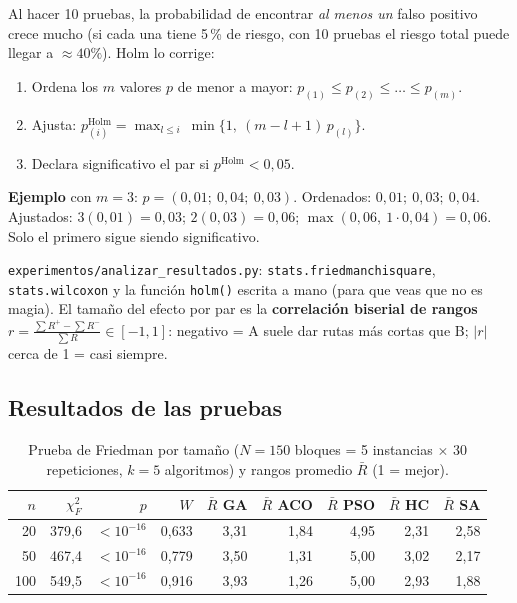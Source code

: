 \documentclass[11pt,a4paper]{article}
\newcommand{\archivo}[1]{\texttt{#1}}
\begin{document}
\begin{mate}
Al hacer 10 pruebas, la probabilidad de encontrar \emph{al menos un} falso positivo crece mucho (si cada una tiene 5\,\% de riesgo, con 10 pruebas
el riesgo total puede llegar a $\approx40\text{\%}$). Holm lo corrige:
\begin{enumerate}
\item Ordena los $m$ valores $p$ de menor a mayor: $p_{(1)}\le p_{(2)}\le\dots\le p_{(m)}$.
\item Ajusta: $p^{\text{Holm}}_{(i)}=\max_{l\le i}\ \min\{1,\ (m-l+1)\,p_{(l)}\}$.
\item Declara significativo el par si $p^{\text{Holm}}<0{,}05$.
\end{enumerate}
\textbf{Ejemplo} con $m=3$: $p=(0{,}01;\ 0{,}04;\ 0{,}03)$. Ordenados: $0{,}01;\ 0{,}03;\ 0{,}04$. Ajustados: $3(0{,}01)=0{,}03$;\; $2(0{,}03)=0{,}06$;\;
$\max(0{,}06,\ 1\cdot0{,}04)=0{,}06$. Solo el primero sigue siendo significativo.
\end{mate}
\begin{codigo}
\archivo{experimentos/analizar\_resultados.py}: \texttt{stats.friedmanchisquare}, \texttt{stats.wilcoxon} y la función \texttt{holm()}
escrita a mano (para que veas que no es magia). El tamaño del efecto por par es la \textbf{correlación biserial de rangos}
$r=\frac{\sum R^+-\sum R^-}{\sum R}\in[-1,1]$: negativo = A suele dar rutas más cortas que B; $|r|$ cerca de 1 = casi siempre.
\end{codigo}

\subsection{Resultados de las pruebas}
\begin{table}[H]\centering\small
\begin{tabular}{rrrrrrrrr}
\toprule
$n$ & $\chi^2_F$ & $p$ & $W$ & $\bar R$ GA & $\bar R$ ACO & $\bar R$ PSO & $\bar R$ HC & $\bar R$ SA \\
\midrule
20 & 379{,}6 & $<10^{-16}$ & 0{,}633 & 3{,}31 & 1{,}84 & 4{,}95 & 2{,}31 & 2{,}58 \\
\midrule
50 & 467{,}4 & $<10^{-16}$ & 0{,}779 & 3{,}50 & 1{,}31 & 5{,}00 & 3{,}02 & 2{,}17 \\
\midrule
100 & 549{,}5 & $<10^{-16}$ & 0{,}916 & 3{,}93 & 1{,}26 & 5{,}00 & 2{,}93 & 1{,}88 \\
\bottomrule
\end{tabular}

\caption{Prueba de Friedman por tamaño ($N=150$ bloques = 5 instancias $\times$ 30 repeticiones, $k=5$ algoritmos) y rangos promedio $\bar R$ (1 = mejor).}
\end{table}
\end{document}
